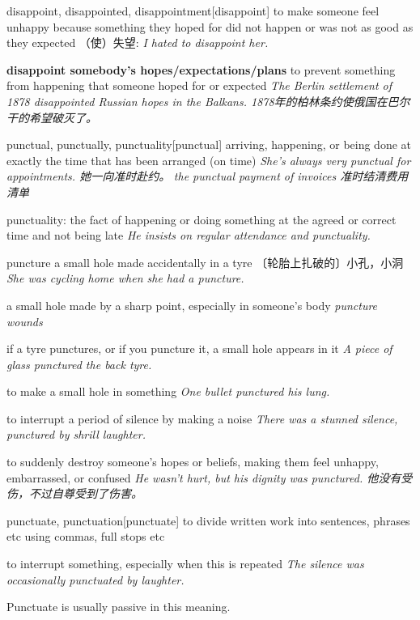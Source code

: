 \begin{DefWord}{disappoint, disappointed, disappointment}[disappoint]
    to make someone feel unhappy because something they hoped for did not happen or was not as good as they expected （使）失望:
    \textit{I hated to disappoint her.}

    \textbf{disappoint somebody's hopes/expectations/plans} to prevent something from happening that someone hoped for or expected
    \textit{The Berlin settlement of 1878 disappointed Russian hopes in the Balkans. 1878年的柏林条约使俄国在巴尔干的希望破灭了。}
\end{DefWord}

\begin{DefWord}{punctual, punctually, punctuality}[punctual]
    arriving, happening, or being done at exactly the time that has been arranged (on time)
    \textit{ She's always very punctual for appointments. 她一向准时赴约。}
    \textit{the punctual payment of invoices 准时结清费用清单}

    punctuality: the fact of happening or doing something at the agreed or correct time and not being late
    \textit{He insists on regular attendance and punctuality.}
\end{DefWord}

\begin{DefWord}{puncture}
    a small hole made accidentally in a tyre 〔轮胎上扎破的〕小孔，小洞
    \textit{She was cycling home when she had a puncture.}

    a small hole made by a sharp point, especially in someone's body
    \textit{puncture wounds}

    if a tyre punctures, or if you puncture it, a small hole appears in it
    \textit{A piece of glass punctured the back tyre.}

    to make a small hole in something
    \textit{One bullet punctured his lung.}

    to interrupt a period of silence by making a noise
    \textit{There was a stunned silence, punctured by shrill laughter.}

    to suddenly destroy someone's hopes or beliefs, making them feel unhappy, embarrassed, or confused
    \textit{He wasn't hurt, but his dignity was punctured. 他没有受伤，不过自尊受到了伤害。}
\end{DefWord}


\begin{DefWord}{punctuate, punctuation}[punctuate]
    to divide written work into sentences, phrases etc using commas, full stops etc

    to interrupt something, especially when this is repeated
    \textit{The silence was occasionally punctuated by laughter.}
    \begin{remark}
        Punctuate is usually passive in this meaning.
    \end{remark}
\end{DefWord}

